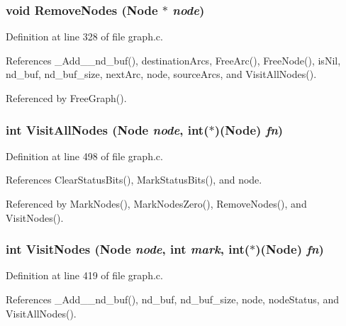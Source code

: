 \subsubsection{\setlength{\rightskip}{0pt plus 5cm}void Remove\-Nodes (\bf{Node} $\ast$ {\em node})}\label{graph_8h_d5015d73326f17e507235e0d42a998bf}




Definition at line 328 of file graph.c.

References \_\-Add\_\_\-nd\_\-buf(), destination\-Arcs, Free\-Arc(), Free\-Node(), is\-Nil, nd\_\-buf, nd\_\-buf\_\-size, next\-Arc, node, source\-Arcs, and Visit\-All\-Nodes().

Referenced by Free\-Graph().
\subsubsection{\setlength{\rightskip}{0pt plus 5cm}int Visit\-All\-Nodes (\bf{Node} {\em node}, int($\ast$)(\bf{Node}) {\em fn})}\label{graph_8h_2f317ea84f8bf39187eb9de4ae939a17}




Definition at line 498 of file graph.c.

References Clear\-Status\-Bits(), Mark\-Status\-Bits(), and node.

Referenced by Mark\-Nodes(), Mark\-Nodes\-Zero(), Remove\-Nodes(), and Visit\-Nodes().
\subsubsection{\setlength{\rightskip}{0pt plus 5cm}int Visit\-Nodes (\bf{Node} {\em node}, int {\em mark}, int($\ast$)(\bf{Node}) {\em fn})}\label{graph_8h_74de981dd26a9ce7580d9ef76a4aff04}




Definition at line 419 of file graph.c.

References \_\-Add\_\_\-nd\_\-buf(), nd\_\-buf, nd\_\-buf\_\-size, node, node\-Status, and Visit\-All\-Nodes().